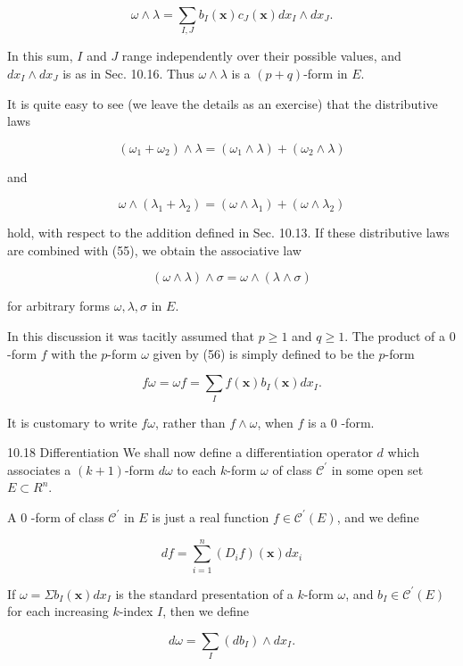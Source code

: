 \documentclass[10pt]{article}
\begin{document}
$$
\omega \wedge \lambda=\sum_{I, J} b_{I}(\mathbf{x}) c_{J}(\mathbf{x}) d x_{I} \wedge d x_{J} .
$$

In this sum, $I$ and $J$ range independently over their possible values, and $d x_{I} \wedge d x_{J}$ is as in Sec. 10.16. Thus $\omega \wedge \lambda$ is a $(p+q)$-form in $E$.

It is quite easy to see (we leave the details as an exercise) that the distributive laws

$$
\left(\omega_{1}+\omega_{2}\right) \wedge \lambda=\left(\omega_{1} \wedge \lambda\right)+\left(\omega_{2} \wedge \lambda\right)
$$

and

$$
\omega \wedge\left(\lambda_{1}+\lambda_{2}\right)=\left(\omega \wedge \lambda_{1}\right)+\left(\omega \wedge \lambda_{2}\right)
$$

hold, with respect to the addition defined in Sec. 10.13. If these distributive laws are combined with (55), we obtain the associative law

$$
(\omega \wedge \lambda) \wedge \sigma=\omega \wedge(\lambda \wedge \sigma)
$$

for arbitrary forms $\omega, \lambda, \sigma$ in $E$.

In this discussion it was tacitly assumed that $p \geq 1$ and $q \geq 1$. The product of a 0 -form $f$ with the $p$-form $\omega$ given by (56) is simply defined to be the $p$-form

$$
f \omega=\omega f=\sum_{I} f(\mathbf{x}) b_{I}(\mathbf{x}) d x_{I} .
$$

It is customary to write $f \omega$, rather than $f \wedge \omega$, when $f$ is a 0 -form.

10.18 Differentiation We shall now define a differentiation operator $d$ which associates a $(k+1)$-form $d \omega$ to each $k$-form $\omega$ of class $\mathscr{C}^{\prime}$ in some open set $E \subset R^{n}$.

A 0 -form of class $\mathscr{C}^{\prime}$ in $E$ is just a real function $f \in \mathscr{C}^{\prime}(E)$, and we define

$$
d f=\sum_{i=1}^{n}\left(D_{i} f\right)(\mathbf{x}) d x_{i}
$$

If $\omega=\Sigma b_{I}(\mathbf{x}) d x_{I}$ is the standard presentation of a $k$-form $\omega$, and $b_{I} \in \mathscr{C}^{\prime}(E)$ for each increasing $k$-index $I$, then we define

$$
d \omega=\sum_{I}\left(d b_{I}\right) \wedge d x_{I} .
$$
\end{document}
